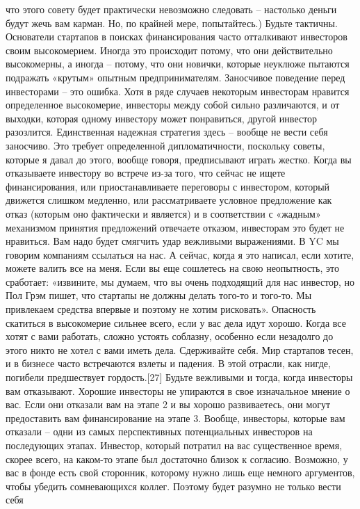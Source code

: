 \documentclass[ebook,12pt,oneside,openany]{memoir}
\begin{document}
что этого совету будет практически невозможно следовать – настолько
деньги будут жечь вам карман. Но, по крайней мере, попытайтесь.)
Будьте тактичны. Основатели стартапов в поисках финансирования часто
отталкивают инвесторов своим высокомерием. Иногда это происходит
потому, что они действительно высокомерны, а иногда – потому, что они
новички, которые неуклюже пытаются подражать «крутым» опытным
предпринимателям. Заносчивое поведение перед инвесторами – это ошибка.
Хотя в ряде случаев некоторым инвесторам нравится определенное
высокомерие, инвесторы между собой сильно различаются, и от выходки,
которая одному инвестору может понравиться, другой инвестор
разозлится. Единственная надежная стратегия здесь – вообще не вести
себя заносчиво. Это требует определенной дипломатичности, поскольку
советы, которые я давал до этого, вообще говоря, предписывают играть
жестко. Когда вы отказываете инвестору во встрече из-за того, что
сейчас не ищете финансирования, или приостанавливаете переговоры с
инвестором, который движется слишком медленно, или рассматриваете
условное предложение как отказ (которым оно фактически и является) и в
соответствии с «жадным» механизмом принятия предложений отвечаете
отказом, инвесторам это будет не нравиться. Вам надо будет смягчить
удар вежливыми выражениями. В YC мы говорим компаниям ссылаться на
нас. А сейчас, когда я это написал, если хотите, можете валить все на
меня. Если вы еще сошлетесь на свою неопытность, это сработает:
«извините, мы думаем, что вы очень подходящий для нас инвестор, но Пол
Грэм пишет, что стартапы не должны делать того-то и того-то. Мы
привлекаем средства впервые и поэтому не хотим рисковать». Опасность
скатиться в высокомерие сильнее всего, если у вас дела идут хорошо.
Когда все хотят с вами работать, сложно устоять соблазну, особенно
если незадолго до этого никто не хотел с вами иметь дела. Сдерживайте
себя. Мир стартапов тесен, и в бизнесе часто встречаются взлеты и
падения. В этой отрасли, как нигде, погибели предшествует
гордость.[27] Будьте вежливыми и тогда, когда инвесторы вам
отказывают. Хорошие инвесторы не упираются в свое изначальное мнение о
вас. Если они отказали вам на этапе 2 и вы хорошо развиваетесь, они
могут предоставить вам финансирование на этапе 3. Вообще, инвесторы,
которые вам отказали – одни из самых перспективных потенциальных
инвесторов на последующих этапах. Инвестор, который потратил на вас
существенное время, скорее всего, на каком-то этапе был достаточно
близок к согласию. Возможно, у вас в фонде есть свой сторонник,
которому нужно лишь еще немного аргументов, чтобы убедить
сомневающихся коллег. Поэтому будет разумно не только вести себя
\end{document}
